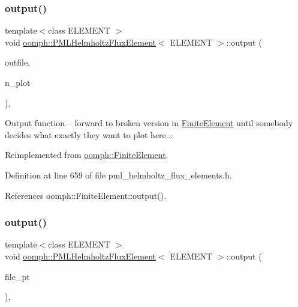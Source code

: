 \subsubsection{\texorpdfstring{output()}{output()}\hspace{0.1cm}{\footnotesize\ttfamily [2/4]}}
{\footnotesize\ttfamily template$<$class E\+L\+E\+M\+E\+NT $>$ \\
void \hyperlink{classoomph_1_1PMLHelmholtzFluxElement}{oomph\+::\+P\+M\+L\+Helmholtz\+Flux\+Element}$<$ E\+L\+E\+M\+E\+NT $>$\+::output (\begin{DoxyParamCaption}\item[{std\+::ostream \&}]{outfile,  }\item[{const unsigned \&}]{n\+\_\+plot }\end{DoxyParamCaption})\hspace{0.3cm}{\ttfamily [inline]}, {\ttfamily [virtual]}}



Output function -- forward to broken version in \hyperlink{classoomph_1_1FiniteElement}{Finite\+Element} until somebody decides what exactly they want to plot here... 



Reimplemented from \hyperlink{classoomph_1_1FiniteElement_afa9d9b2670f999b43e6679c9dd28c457}{oomph\+::\+Finite\+Element}.



Definition at line 659 of file pml\+\_\+helmholtz\+\_\+flux\+\_\+elements.\+h.



References oomph\+::\+Finite\+Element\+::output().

\mbox{\label{classoomph_1_1PMLHelmholtzFluxElement_ac4961df891c00c8f49fc804953c981ce}} 
\subsubsection{\texorpdfstring{output()}{output()}\hspace{0.1cm}{\footnotesize\ttfamily [3/4]}}
{\footnotesize\ttfamily template$<$class E\+L\+E\+M\+E\+NT $>$ \\
void \hyperlink{classoomph_1_1PMLHelmholtzFluxElement}{oomph\+::\+P\+M\+L\+Helmholtz\+Flux\+Element}$<$ E\+L\+E\+M\+E\+NT $>$\+::output (\begin{DoxyParamCaption}\item[{F\+I\+LE $\ast$}]{file\+\_\+pt }\end{DoxyParamCaption})\hspace{0.3cm}{\ttfamily [inline]}, {\ttfamily [virtual]}}

